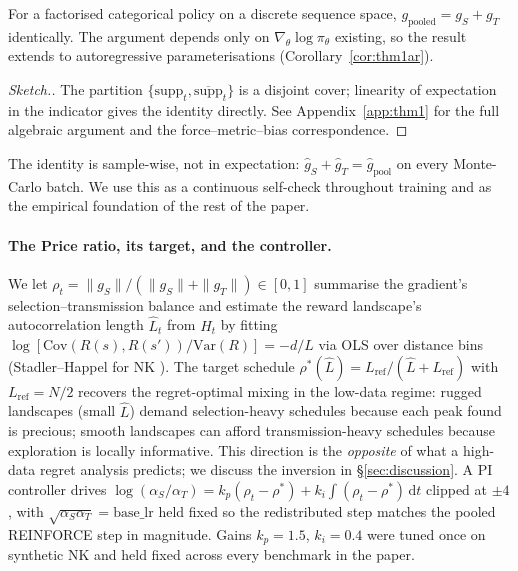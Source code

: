 \begin{theorem}[Exactness]
\label{thm:exact}
For a factorised categorical policy on a discrete sequence space, $g_{\mathrm{pooled}} = g_S + g_T$ identically. The argument depends only on $\nabla_\theta \log\pi_\theta$ existing, so the result extends to autoregressive parameterisations (Corollary~\ref{cor:thm1ar}).
\end{theorem}
\begin{proof}[Sketch.] The partition $\{\mathrm{supp}_t, \overline{\mathrm{supp}}_t\}$ is a disjoint cover; linearity of expectation in the indicator gives the identity directly. See Appendix~\ref{app:thm1} for the full algebraic argument and the \citet{frank2025price} force--metric--bias correspondence.\end{proof}

The identity is sample-wise, not in expectation: $\hat g_S + \hat g_T = \hat g_{\mathrm{pool}}$ on every Monte-Carlo batch. We use this as a continuous self-check throughout training and as the empirical foundation of the rest of the paper.

\paragraph{The Price ratio, its target, and the controller.} We let $\rho_t = \|g_S\| / (\|g_S\| + \|g_T\|) \in [0,1]$ summarise the gradient's selection--transmission balance and estimate the reward landscape's autocorrelation length $\hat L_t$ from $H_t$ by fitting $\log[\mathrm{Cov}(R(s),R(s'))/\mathrm{Var}(R)] = -d/L$ via OLS over distance bins (Stadler--Happel for NK \citep{stadler1999random}). The target schedule
\(
\rho^*(\hat L) = L_{\mathrm{ref}}/(\hat L + L_{\mathrm{ref}})
\)
with $L_{\mathrm{ref}} = N/2$ recovers the regret-optimal mixing in the low-data regime: rugged landscapes (small $\hat L$) demand selection-heavy schedules because each peak found is precious; smooth landscapes can afford transmission-heavy schedules because exploration is locally informative. This direction is the \emph{opposite} of what a high-data regret analysis predicts; we discuss the inversion in §\ref{sec:discussion}. A PI controller drives $\log(\alpha_S/\alpha_T) = k_p (\rho_t - \rho^*) + k_i \int (\rho_t - \rho^*)\,\mathrm{d}t$ clipped at $\pm 4$, with $\sqrt{\alpha_S \alpha_T} = \mathrm{base\_lr}$ held fixed so the redistributed step matches the pooled REINFORCE step in magnitude. Gains $k_p=1.5$, $k_i=0.4$ were tuned once on synthetic NK and held fixed across every benchmark in the paper.


